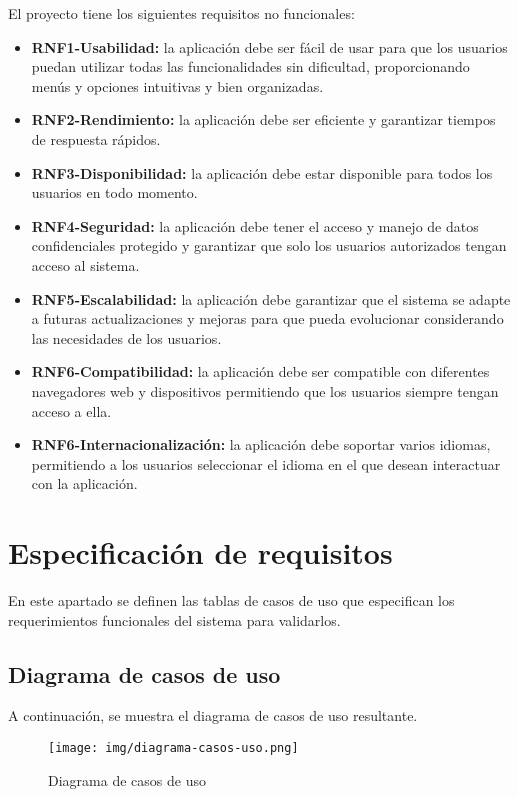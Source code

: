 El proyecto tiene los siguientes requisitos no funcionales:
\begin{itemize}
\tightlist
    \item \textbf{RNF1-Usabilidad:} la aplicación debe ser fácil de usar para que los usuarios puedan utilizar todas las funcionalidades sin dificultad, proporcionando menús y opciones intuitivas y bien organizadas.
    \item \textbf{RNF2-Rendimiento:} la aplicación debe ser eficiente y garantizar tiempos de respuesta rápidos.
    \item \textbf{RNF3-Disponibilidad:} la aplicación debe estar disponible para todos los usuarios en todo momento.
    \item \textbf{RNF4-Seguridad:} la aplicación debe tener el acceso y manejo de datos confidenciales protegido y garantizar que solo los usuarios autorizados tengan acceso al sistema.
    \item \textbf{RNF5-Escalabilidad:} la aplicación debe garantizar que el sistema se adapte a futuras actualizaciones y mejoras para que pueda evolucionar considerando las necesidades de los usuarios.
    \item \textbf{RNF6-Compatibilidad:} la aplicación debe ser compatible con diferentes navegadores web y dispositivos permitiendo que los usuarios siempre tengan acceso a ella.
    \item \textbf{RNF6-Internacionalización:} la aplicación debe soportar varios idiomas, permitiendo a los usuarios seleccionar el idioma en el que desean interactuar con la aplicación. 
\end{itemize}

\section{Especificación de requisitos}
En este apartado se definen las tablas de casos de uso que especifican los requerimientos funcionales del sistema para validarlos.

\subsection{Diagrama de casos de uso}
A continuación, se muestra el diagrama de casos de uso resultante.
\begin{landscape}
\begin{figure}[h]
    \advance\leftskip-4cm 
    \texttt{[image: img/diagrama-casos-uso.png]}
    \caption{Diagrama de casos de uso}
\end{figure}
\end{landscape}


